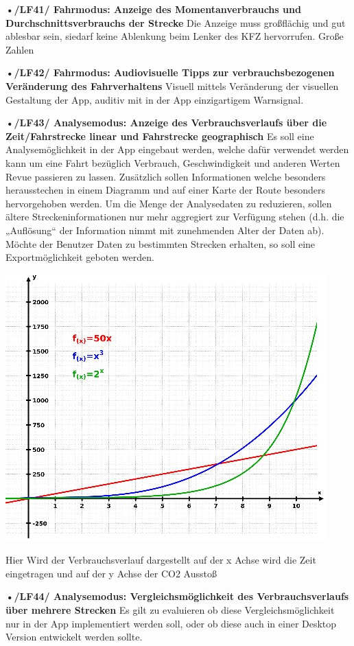 \textbf{•/LF41/ Fahrmodus: Anzeige des Momentanverbrauchs und Durchschnittsverbrauchs der Strecke}
Die Anzeige muss großflächig und gut ablesbar sein, siedarf  keine Ablenkung beim Lenker des KFZ hervorrufen. 
Große Zahlen

\textbf{•/LF42/ Fahrmodus: Audiovisuelle Tipps zur verbrauchsbezogenen Veränderung des Fahrverhaltens}
Visuell mittels Veränderung der visuellen Gestaltung der App, auditiv mit in der App einzigartigem Warnsignal.

\textbf{•/LF43/ Analysemodus: Anzeige des Verbrauchsverlaufs über die Zeit/Fahrstrecke linear und Fahrstrecke geographisch}
Es soll eine Analysemöglichkeit in der App eingebaut werden, welche dafür verwendet werden kann um eine Fahrt bezüglich Verbrauch, Geschwindigkeit und anderen Werten Revue passieren zu lassen. Zusätzlich sollen Informationen welche besonders herausstechen in einem Diagramm und auf einer Karte der Route besonders hervorgehoben werden. Um die Menge der Analysedaten zu reduzieren, sollen ältere Streckeninformationen nur mehr aggregiert zur Verfügung stehen (d.h. die „Auflösung“ der Information nimmt mit zunehmenden Alter der Daten ab). Möchte der Benutzer Daten zu bestimmten Strecken erhalten, so soll eine Exportmöglichkeit geboten werden.

\includegraphics{images/LF43_Diagramm.jpg}

Hier Wird der Verbrauchsverlauf dargestellt auf der x Achse wird die Zeit eingetragen und auf der y Achse der CO2 Ausstoß

\textbf{•/LF44/ Analysemodus: Vergleichsmöglichkeit des Verbrauchsverlaufs über mehrere Strecken}
Es gilt zu evaluieren ob diese Vergleichsmöglichkeit nur in der App implementiert werden soll, oder ob diese auch in einer Desktop Version entwickelt werden sollte.

